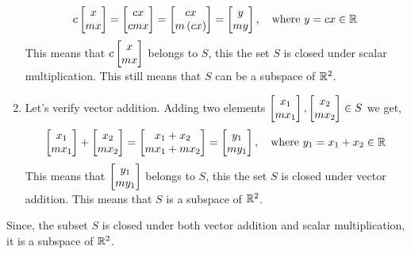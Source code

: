 \begin{example}
\begin{enumerate}
        \[ c \bmxc x \\ m x\emx = \bmxc c x \\ c m x \emx = \bmxc c x \\ m \pp{c x} \emx = \bmxc y \\ m y\emx, \quad \text{where} \,\, y = c x \in \mb{R} \]
        This means that $c\bmxc x \\ m x\emx$ belongs to $S$, this the set $S$ is closed under scalar multiplication. This still means that $S$ can be a subspace of $\mathbb{R}^2$.
        \item Let's verify vector addition. Adding two elements $\bmxc x_1 \\ m x_1\emx, \bmxc x_2 \\ m x_2\emx \in S$ we get,
        \[ \bmxc x_1 \\ m x_1\emx + \bmxc x_2 \\ m x_2\emx = \bmxc x_1 + x_2 \\ m x_1 + m x_2 \emx = \bmxc y_1 \\ m y_1\emx, \quad \text{where} \,\, y_1 = x_1 + x_2 \in \mb{R} \]
        This means that $\bmxc y_1 \\ m y_1\emx$ belongs to $S$, this the set $S$ is closed under vector addition. This means that $S$ is a subspace of $\mathbb{R}^2$.
    \end{enumerate}
    Since, the subset $S$ is closed under both vector addition and scalar multiplication, it is a subspace of $\mathbb{R}^2$.
\end{example}




    

